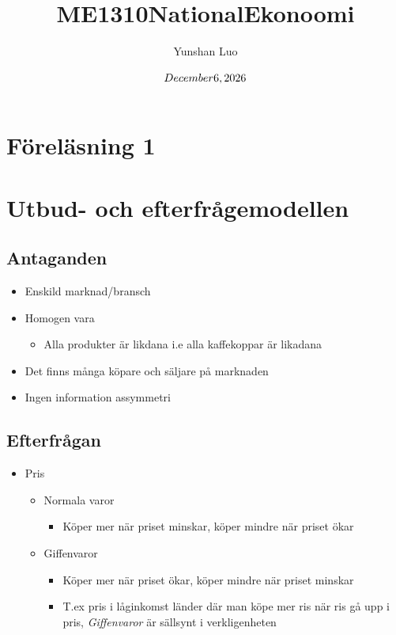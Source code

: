 \documentclass[12pt,a4paper]{article}
\title{ME1310NationalEkonoomi}
\author{Yunshan Luo}
\date{$\today$}
\begin{document}
\section*{Föreläsning 1}



\section*{Utbud- och efterfrågemodellen}
\subsection*{Antaganden}
\begin{itemize}
    \item Enskild marknad/bransch
    \item Homogen vara
          \begin{itemize}
              \item Alla produkter är likdana i.e alla kaffekoppar är likadana
          \end{itemize}
    \item Det finns många köpare och säljare på marknaden
    \item Ingen information assymmetri
\end{itemize}



\subsection*{Efterfrågan}
\begin{itemize}
    \item Pris
          \begin{itemize}
              \item Normala varor
                    \begin{itemize}
                        \item Köper mer när priset minskar, köper mindre när priset ökar
                    \end{itemize}
          \end{itemize}
          \begin{itemize}
              \item Giffenvaror
                    \begin{itemize}
                        \item Köper mer när priset ökar, köper mindre när priset minskar
                        \item T.ex pris i låginkomst länder där man köpe mer ris när ris gå upp i pris, \textit{Giffenvaror} är sällsynt i verkligenheten
                    \end{itemize}
          \end{itemize}
\end{itemize}
\end{document}
